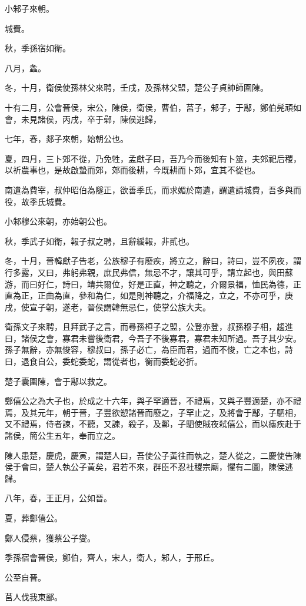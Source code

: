 \begin{pinyinscope}
小邾子來朝。

城費。

秋，季孫宿如衛。

八月，螽。

冬，十月，衛侯使孫林父來聘，壬戌，及孫林父盟，楚公子貞帥師圍陳。

十有二月，公會晉侯，宋公，陳侯，衛侯，曹伯，莒子，邾子，于鄬，鄭伯髡頑如會，未見諸侯，丙戌，卒于鄵，陳侯逃歸，

七年，春，郯子來朝，始朝公也。

夏，四月，三卜郊不從，乃免牲，孟獻子曰，吾乃今而後知有卜筮，夫郊祀后稷，以祈農事也，是故啟蟄而郊，郊而後耕，今既耕而卜郊，宜其不從也。

南遺為費宰，叔仲昭伯為隧正，欲善季氏，而求媚於南遺，謂遺請城費，吾多與而役，故季氏城費。

小邾穆公來朝，亦始朝公也。

秋，季武子如衛，報子叔之聘，且辭緩報，非貳也。

冬，十月，晉韓獻子告老，公族穆子有廢疾，將立之，辭曰，詩曰，豈不夙夜，謂行多露，又曰，弗躬弗親，庶民弗信，無忌不才，讓其可乎，請立起也，與田蘇游，而曰好仁，詩曰，靖共爾位，好是正直，神之聽之，介爾景福，恤民為德，正直為正，正曲為直，參和為仁，如是則神聽之，介福降之，立之，不亦可乎，庚戌，使宣子朝，遂老，晉侯謂韓無忌仁，使掌公族大夫。

衛孫文子來聘，且拜武子之言，而尋孫桓子之盟，公登亦登，叔孫穆子相，趨進曰，諸侯之會，寡君未嘗後衛君，今吾子不後寡君，寡君未知所過。吾子其少安。孫子無辭，亦無悛容，穆叔曰，孫子必亡，為臣而君，過而不悛，亡之本也，詩曰，退食自公，委蛇委蛇，謂從者也，衡而委蛇必折。

楚子囊圍陳，會于鄬以救之。

鄭僖公之為大子也，於成之十六年，與子罕適晉，不禮焉，又與子豐適楚，亦不禮焉，及其元年，朝于晉，子豐欲愬諸晉而廢之，子罕止之，及將會于鄬，子駟相，又不禮焉，侍者諫，不聽，又諫，殺子，及鄵，子駟使賊夜弒僖公，而以瘧疾赴于諸侯，簡公生五年，奉而立之。

陳人患楚，慶虎，慶寅，謂楚人曰，吾使公子黃往而執之，楚人從之，二慶使告陳侯于會曰，楚人執公子黃矣，君若不來，群臣不忍社稷宗廟，懼有二圖，陳侯逃歸。

八年，春，王正月，公如晉。

夏，葬鄭僖公。

鄭人侵蔡，獲蔡公子燮。

季孫宿會晉侯，鄭伯，齊人，宋人，衛人，邾人，于邢丘。

公至自晉。

莒人伐我東鄙。


\end{pinyinscope}
